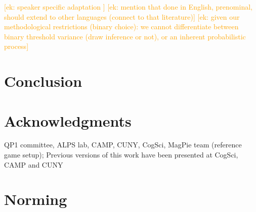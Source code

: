 \documentclass[a4paper,man,floatsintext,natbib]{apa6}
\newcommand{\ek}[1]{\textcolor{Orange}{[ek: #1]}}
\begin{document}
\ek{speaker specific adaptation \citep{Pogue:2016}}
\ek{mention that done in English, prenominal, should extend to other languages (connect to that literature)}
\ek{given our methodological restrictions (binary choice): we cannot differentiate between binary threshold variance (draw inference or not), or an inherent probabilistic process}

\section{Conclusion}\label{sec:conclusion}




































\section{Acknowledgments}
QP1 committee, ALPS lab, CAMP, CUNY, CogSci, MagPie team (reference game setup);
Previous versions of this work have been presented at CogSci, CAMP and CUNY

\appendix


\section{Norming}\label{sec:norming}
\end{document}
